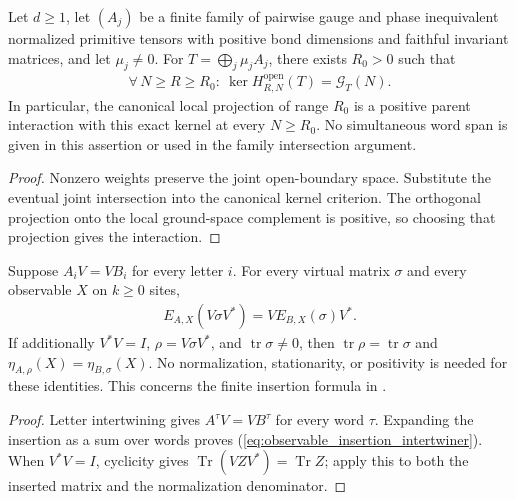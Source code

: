 \begin{lemma}
    \label{thm:primitive_parent_interaction_from_overlap}
    \leanok
    Let $d\ge1$, let $(A_j)$ be a finite family of pairwise gauge and phase
    inequivalent normalized primitive tensors with positive bond dimensions
    and faithful invariant matrices, and let $\mu_j\ne0$.
    For $T=\bigoplus_j\mu_jA_j$, there exists $R_0>0$ such that
    \begin{align}
        \forall\,N\ge R\ge R_0:\ \ker H_{R,N}^{\mathrm{open}}(T)=\mathcal G_T(N).
    \end{align}
    In particular, the canonical local projection of range $R_0$ is a
    positive parent interaction with this exact kernel at every $N\ge R_0$.
    No simultaneous word span is given in this assertion or used in the
    family intersection argument.
\end{lemma}
\begin{proof}\leanok
    Nonzero weights preserve the joint open-boundary space. Substitute
    the eventual joint intersection into the canonical kernel criterion.
    The orthogonal projection onto the local ground-space complement is
    positive, so choosing that projection gives the interaction.
\end{proof}

\begin{lemma}
    \label{thm:observable_insertion_isometric_intertwiner}
    \leanok
    Suppose $A_iV=VB_i$ for every letter $i$. For every virtual matrix
    $\sigma$ and every observable $X$ on $k\geq0$ sites,
    \begin{align}
        E_{A,X}(V\sigma V^*)=V E_{B,X}(\sigma)V^*.
        \label{eq:observable_insertion_intertwiner}
    \end{align}
    If additionally $V^*V=I$, $\rho=V\sigma V^*$, and
    $\operatorname{tr}\sigma\neq0$, then $\operatorname{tr}\rho=\operatorname{tr}\sigma$ and
    $\eta_{A,\rho}(X)=\eta_{B,\sigma}(X)$.
    No normalization, stationarity, or positivity is needed for these
    identities. This concerns the finite insertion formula in
    \cite[Section~3]{Nachtergaele1996Spectral}.
\end{lemma}
\begin{proof}\leanok
    Letter intertwining gives $A^\tau V=VB^\tau$ for every word $\tau$.
    Expanding the insertion as a sum over words proves
    (\ref{eq:observable_insertion_intertwiner}). When $V^*V=I$, cyclicity
    gives $\operatorname{Tr}(VZV^*)=\operatorname{Tr}Z$; apply this to both
    the inserted matrix and the normalization denominator.
\end{proof}

